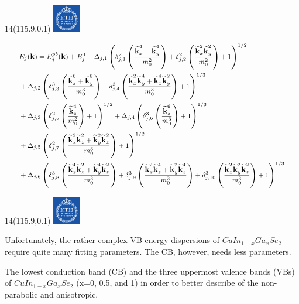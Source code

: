 \documentclass[]{beamer}
\newcommand{\MyLogo}{%
\begin{textblock}{14}(115.9,0.1)
  \includegraphics[width=1.22cm]{kth_rgb}
 \end{textblock}
}
\begin{document}
\begin{frame}
\MyLogo
\begin{equation}\footnotesize
\label{parabolic}\begin{split}
& \small E_j(\textbf{k}) = E_{j}^{pb}(\textbf{k}) + E_j^0 + \Delta_{j,1} \left( \delta_{j,1}^2 \left(  \frac{\widetilde{\textbf{k}}_{x}^{4}+\widetilde{ \textbf{k}}_{y}^{4}}{m_{0}^{2}} \right)  + \delta_{j,2}^2 \left( \frac{\widetilde{\textbf{k}}_{x}^{2}\widetilde{\textbf{k}}_{y}^{2}}{m_{0}^2}  \right) + 1 \right)^{1/2}  \\
& \small +  \Delta_{j,2} \left( \delta_{j,3}^3 \left(  \frac{\widetilde{\textbf{k}}_{x}^{6}+\widetilde{ \textbf{k}}_{y}^{6}}{m_{0}^{3}} \right)  + \delta_{j,4}^3 \left( \frac{\widetilde{\textbf{k}}_{x}^{2}\widetilde{\textbf{k}}_{y}^{4} + \widetilde{\textbf{k}}_{x}^{4}\widetilde{\textbf{k}}_{y}^{2}}{m_{0}^3}  \right) + 1 \right)^{1/3}  \\
& \small +  \Delta_{j,3} \left( \delta_{j,5}^2 \left(  \frac{\widetilde{\textbf{k}}_{z}^{4}}{m_0^2} \right) + 1 \right)^{1/2} + \Delta_{j,4} \left( \delta_{j,6}^3 \left(  \frac{\widetilde{\textbf{k}}_{z}^{6}}{m_0^3} \right) + 1 \right)^{1/3} \\
& \small +  \Delta_{j,5} \left( \delta_{j,7}^2 \left( \frac{\widetilde{\textbf{k}}_{x}^{2}\widetilde{\textbf{k}}_{z}^{2} + \widetilde{\textbf{k}}_{y}^{2}\widetilde{\textbf{k}}_{z}^{2}}{m_{0}^3}  \right) + 1 \right)^{1/2} \\
& \small +  \Delta_{j,6} \left( \delta_{j,8}^3 \left( \frac{\widetilde{\textbf{k}}_{x}^{4}\widetilde{\textbf{k}}_{z}^{2} + \widetilde{\textbf{k}}_{y}^{4}\widetilde{\textbf{k}}_{z}^{2}}{m_{0}^3}  \right) + \delta_{j,9}^3 \left( \frac{\widetilde{\textbf{k}}_{x}^{2}\widetilde{\textbf{k}}_{z}^{4} + \widetilde{\textbf{k}}_{y}^{2}\widetilde{\textbf{k}}_{z}^{4}}{m_{0}^3}  \right) +  \delta_{j,10}^3 \left( \frac{\widetilde{\textbf{k}}_{x}^{2}\widetilde{\textbf{k}}_{y}^{2}\widetilde{\textbf{k}}_{z}^{2}}{m_{0}^3}  \right) +1 \right)^{1/3} 
\end{split}\end{equation}
\end{frame}


\begin{frame}
\MyLogo
Unfortunately, the rather complex VB energy dispersions of $CuIn_{1-x}Ga_{x}Se_2$ require quite many fitting parameters. The CB, however, needs less parameters.

\vspace*{3\baselineskip}

The lowest conduction band (CB) and the three uppermost valence bands (VBs) of $CuIn_{1-x}Ga_{x}Se_2$ (x=0, 0.5, and 1) in order to better describe of the non-parabolic and anisotropic.
\end{frame}
\end{document}
